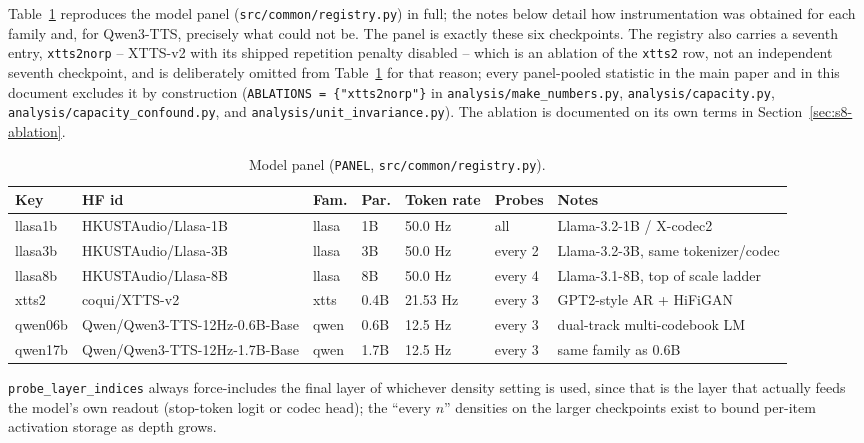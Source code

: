 \documentclass[11pt]{article}
\begin{document}
Table~\ref{tab:panel} reproduces the model panel
(\texttt{src/common/registry.py}) in full; the notes below detail how
instrumentation was obtained for each family and, for Qwen3-TTS, precisely
what could not be. The panel is exactly these six checkpoints. The registry
also carries a seventh entry, \texttt{xtts2norp} -- XTTS-v2 with its shipped
repetition penalty disabled -- which is an ablation of the \texttt{xtts2} row,
not an independent seventh checkpoint, and is deliberately omitted from
Table~\ref{tab:panel} for that reason; every panel-pooled statistic in the
main paper and in this document excludes it by construction
(\texttt{ABLATIONS = \{"xtts2norp"\}} in \texttt{analysis/make\_numbers.py},
\texttt{analysis/capacity.py}, \texttt{analysis/capacity\_confound.py}, and
\texttt{analysis/unit\_invariance.py}). The ablation is documented on its own
terms in Section~\ref{sec:s8-ablation}.

\begin{table}[h]
\centering
\caption{Model panel (\texttt{PANEL}, \texttt{src/common/registry.py}).}
\label{tab:panel}
\footnotesize
\begin{tabular}{@{}p{1.5cm}p{3.4cm}l p{0.8cm} p{1.3cm} p{1.5cm} p{4.4cm}@{}}
\toprule
Key & HF id & Fam. & Par. & Token rate & Probes & Notes \\
\midrule
llasa1b & HKUSTAudio/\allowbreak Llasa-1B & llasa & 1B & 50.0 Hz & all & Llama-3.2-1B / X-codec2 \\
llasa3b & HKUSTAudio/\allowbreak Llasa-3B & llasa & 3B & 50.0 Hz & every 2 & Llama-3.2-3B, same tokenizer/codec \\
llasa8b & HKUSTAudio/\allowbreak Llasa-8B & llasa & 8B & 50.0 Hz & every 4 & Llama-3.1-8B, top of scale ladder \\
xtts2 & coqui/\allowbreak XTTS-v2 & xtts & 0.4B & 21.53 Hz & every 3 & GPT2-style AR + HiFiGAN \\
qwen06b & Qwen/\allowbreak Qwen3-TTS-\allowbreak 12Hz-\allowbreak 0.6B-Base & qwen & 0.6B & 12.5 Hz & every 3 & dual-track multi-codebook LM \\
qwen17b & Qwen/\allowbreak Qwen3-TTS-\allowbreak 12Hz-\allowbreak 1.7B-Base & qwen & 1.7B & 12.5 Hz & every 3 & same family as 0.6B \\
\bottomrule
\end{tabular}
\end{table}

\texttt{probe\_layer\_indices} always force-includes the final layer of
whichever density setting is used, since that is the layer that actually
feeds the model's own readout (stop-token logit or codec head); the ``every
$n$'' densities on the larger checkpoints exist to bound per-item activation
storage as depth grows.
\end{document}
